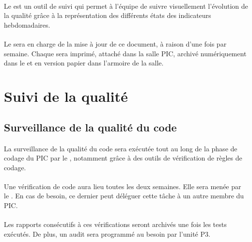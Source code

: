 \paragraph*{} Le \TB{} est un outil de suivi qui permet à l'équipe \nomEquipe{} de suivre visuellement l'évolution de la qualité grâce à la représentation des différents états des indicateurs
hebdomadaires.

\paragraph*{} Le \RQ{} sera en charge de la mise à jour de ce document, à raison d'une
fois par semaine. Chaque \TB{} sera imprimé, attaché dans la salle PIC, archivé
numériquement dans le \DSQ{} et en version papier dans l'armoire de la salle.

\section{Suivi de la qualité}
\label{Suivi de la qualite}
\subsection{Surveillance de la qualité du code}
\label{Surveillance de la qualite du code}
\paragraph*{} La surveillance de la qualité du code sera exécutée tout au long de la phase de codage du
PIC par le \RD , notamment grâce à des outils de vérification de règles de codage.

\paragraph*{} Une vérification de code aura lieu toutes les deux semaines. Elle sera menée par le \RD . En cas de besoin, ce dernier peut déléguer cette tâche à un autre membre
du PIC.

\paragraph*{} Les rapports consécutifs à ces vérifications seront archivés une fois les tests exécutés. De plus, un audit sera programmé au besoin par l'unité P3.

\subsection{\FT}
